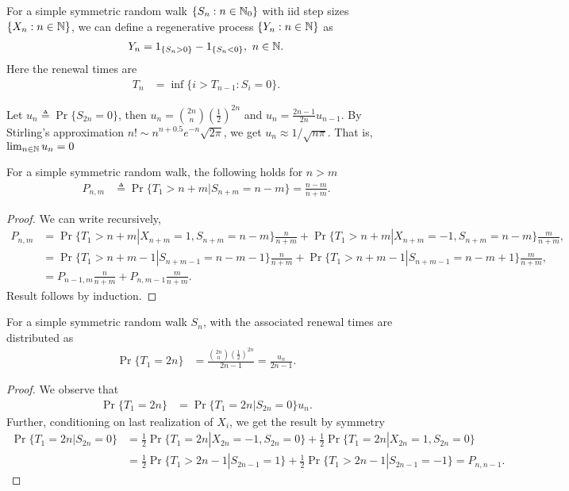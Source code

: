 \documentclass[a4paper,10pt,english]{article}
\begin{document}
\begin{defn} For a simple symmetric random walk $\{S_n: n \in \mathbb{N}_0\}$ with iid step sizes $\{X_n: n \in \mathbb{N}\}$, we can define a regenerative process $\{Y_n: n \in \mathbb{N}\}$ as 
\begin{align*}
Y_n = 1_{\{S_n > 0\}} - 1_{\{S_n < 0\}},~n \in \mathbb{N}.
\end{align*}
Here the renewal times are 
\begin{align*}
T_n &= \inf\{ i > T_{n-1}: S_i = 0\}.
\end{align*}
\end{defn}
\begin{rem} Let $u_n \triangleq \Pr\{S_{2n} = 0\}$, then $u_n = \binom{2n}{n}\left(\frac{1}{2}\right)^{2n}$ and $u_n = \frac{2n-1}{2n}u_{n-1}$. By Stirling's approximation $n! \sim n^{n+0.5}e^{-n}\sqrt{2\pi}$, we get $u_n \approx 1/\sqrt{n\pi}$. That is, $\lim_{n \in \mathbb{N}}u_n = 0$
\end{rem}
\begin{lem} For a simple symmetric random walk, the following holds for $n > m$
\begin{align*}
P_{n,m} &\triangleq \Pr\{T_1 > n+m | S_{n+m} = n-m\} = \frac{n-m}{n+m}.
\end{align*}
\end{lem}
\begin{proof}
We can write recursively,
\begin{align*}
P_{n,m} &= \Pr\{T_1 > n+m| X_{n+m} = 1, S_{n+m} = n-m\}\frac{n}{n+m} + \Pr\{T_1 > n+m| X_{n+m} = -1, S_{n+m} = n-m\}\frac{m}{n+m},\\
&= \Pr\{T_1 > n+m-1 | S_{n+m-1} = n-m-1\}\frac{n}{n+m} + \Pr\{T_1 > n+m-1 | S_{n+m-1} = n-m+1 \}\frac{m}{n+m},\\
&= P_{n-1,m}\frac{n}{n+m} +P_{n,m-1}\frac{m}{n+m}.
\end{align*}
Result follows by induction.
\end{proof}
\begin{lem} For a simple symmetric random walk $S_n$, with the associated renewal times are distributed as 
\begin{align*}
\Pr\{T_1 = 2n\} &= \frac{\binom{2n}{n}\left(\frac{1}{2}\right)^{2n}}{2n-1} = \frac{u_n}{2n-1}.
\end{align*}
\end{lem}
\begin{proof} We observe that 
\begin{align*}
\Pr\{T_1 = 2n\} &= \Pr\{T_1 = 2n | S_{2n} = 0 \}u_n.
\end{align*}
Further, conditioning on last realization of $X_i$, we get the result by symmetry
\begin{align*}
\Pr\{T_1 = 2n | S_{2n} = 0 \} &= \frac{1}{2} \Pr\{T_1 = 2n | X_{2n} = -1,S_{2n} = 0 \} +  \frac{1}{2} \Pr\{T_1 = 2n | X_{2n} = 1, S_{2n} = 0 \} \\
&=  \frac{1}{2} \Pr\{T_1 > 2n-1 | S_{2n-1} = 1\} +  \frac{1}{2} \Pr\{T_1 > 2n-1 | S_{2n-1} = -1\}  = P_{n,n-1}.
\end{align*}
\end{proof}
\end{document}
